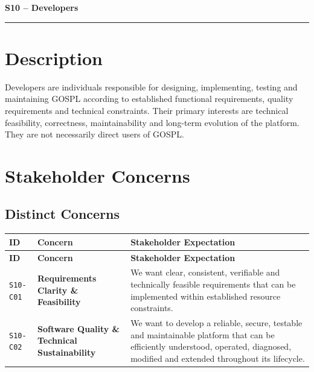 \documentclass[11pt,a4paper]{article}
\begin{document}

{\LARGE\bfseries S10 -- Developers\par}\vspace{1em}
\noindent\rule{\linewidth}{0.4pt}

\section*{Description}

Developers are individuals responsible for designing, implementing, testing and maintaining GOSPL according to established functional requirements, quality requirements and technical constraints. Their primary interests are technical feasibility, correctness, maintainability and long-term evolution of the platform. They are not necessarily direct users of GOSPL.

\section*{Stakeholder Concerns}

\subsection*{Distinct Concerns}

\begingroup\small
\begin{longtable}{@{}>{\raggedright\arraybackslash}p{}>{\raggedright\arraybackslash}p{}>{\raggedright\arraybackslash}p{}@{}}
\toprule
\textbf{ID} & \textbf{Concern} & \textbf{Stakeholder Expectation} \\
\midrule
\endfirsthead
\toprule
\textbf{ID} & \textbf{Concern} & \textbf{Stakeholder Expectation} \\
\midrule
\endhead
\bottomrule
\endfoot
\texttt{S10-C01} & \textbf{Requirements Clarity \& Feasibility} & We want clear, consistent, verifiable and technically feasible requirements that can be implemented within established resource constraints. \\
\addlinespace
\texttt{S10-C02} & \textbf{Software Quality \& Technical Sustainability} & We want to develop a reliable, secure, testable and maintainable platform that can be efficiently understood, operated, diagnosed, modified and extended throughout its lifecycle. \\
\end{longtable}
\endgroup
\end{document}
